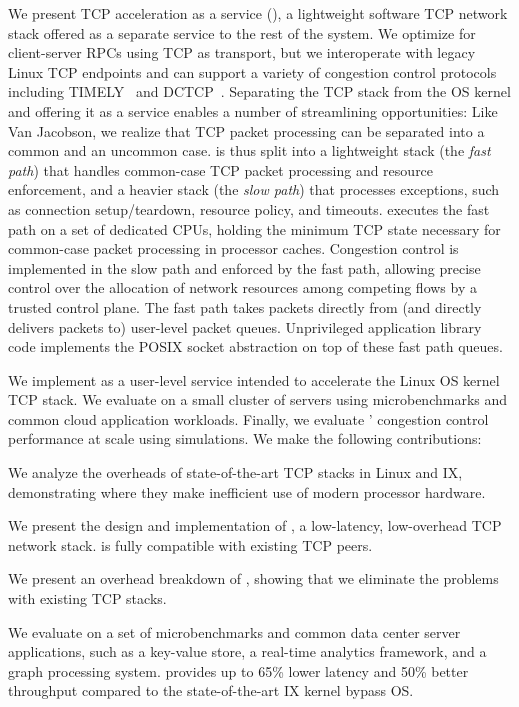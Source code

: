 We present TCP acceleration as a service (\softtcp), a lightweight
software TCP network stack offered as a separate service to the rest
of the system. We optimize for client-server RPCs using TCP as
transport, but we interoperate with legacy Linux TCP endpoints and can
support a variety of congestion control protocols including
TIMELY~\cite{timely} and DCTCP~\cite{dctcp}. Separating the TCP stack
from the OS kernel and offering it as a service enables a number of
streamlining opportunities: Like Van Jacobson, we realize that TCP
packet processing can be separated into a common and an uncommon
case. \softtcp is thus split into a lightweight stack (the \emph{fast
  path}) that handles common-case TCP packet processing and resource
enforcement, and a heavier stack (the \emph{slow path}) that processes
exceptions, such as connection setup/teardown, resource policy, and
timeouts. \softtcp executes the fast path on a set of dedicated CPUs,
holding the minimum TCP state necessary for common-case packet
processing in processor caches. Congestion control is implemented in
the slow path and enforced by the fast path, allowing precise control
over the allocation of network resources among competing flows by a
trusted control plane.  The fast path takes packets directly from (and
directly delivers packets to) user-level packet queues.  Unprivileged
application library code implements the POSIX socket abstraction on
top of these fast path queues.

We implement \softtcp as a user-level service intended to accelerate
the Linux OS kernel TCP stack. We evaluate \taas on a small cluster of
servers using microbenchmarks and common cloud application
workloads. Finally, we evaluate \taas' congestion control performance
at scale using simulations.
%
%
We make the following contributions:

\begin{compactitem}[\labelitemi]
\item We analyze the overheads of state-of-the-art TCP stacks in Linux
  and IX, demonstrating where they make inefficient use of modern
  processor hardware.

\item We present the design and implementation of \softtcp, a
  low-latency, low-overhead TCP network stack. \softtcp is fully
  compatible with existing TCP peers.

\item We present an overhead breakdown of \softtcp, showing that we
  eliminate the problems with existing TCP stacks.

\item We evaluate \softtcp on a set of microbenchmarks and common data
  center server applications, such as a key-value store, a real-time
  analytics framework, and a graph processing system. \softtcp
  provides up to 65\% lower latency and 50\% better throughput
  compared to the state-of-the-art IX kernel bypass OS.
\end{compactitem}

